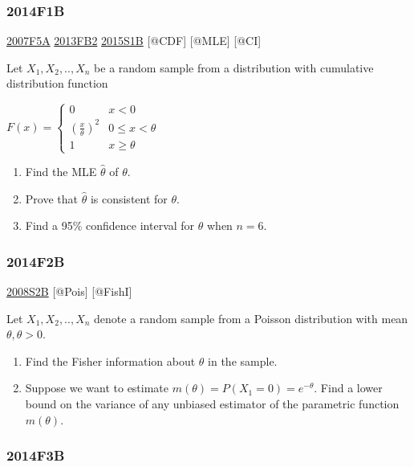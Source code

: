 \documentclass[6pt,Portrait]{article}
\begin{document}
\hypertarget{f1b-1}{%
\subsubsection{2014F1B}\label{f1b-1}}

\protect\hyperlink{f5a}{2007F5A} \protect\hyperlink{fb2-2}{2013FB2}
\protect\hyperlink{s1b-1}{2015S1B} {[}@CDF{]} {[}@MLE{]} {[}@CI{]}

Let \(X_1,X_2,..,X_n\) be a random sample from a distribution with
cumulative distribution function

\(F(x)=\begin{cases}0&x<0\\(\frac{x}\theta)^2& 0\le x<\theta\\1& x\ge\theta\end{cases}\)

\begin{enumerate}
\def\labelenumi{(\alph{enumi})}
\item
  Find the MLE \(\hat\theta\) of \(\theta\).
\item
  Prove that \(\hat\theta\) is consistent for \(\theta\).
\item
  Find a 95\% confidence interval for \(\theta\) when \(n=6\).
\end{enumerate}

\hypertarget{f2b-1}{%
\subsubsection{2014F2B}\label{f2b-1}}

\protect\hyperlink{s2b}{2008S2B} {[}@Pois{]} {[}@FishI{]}

Let \(X_1,X_2,..,X_{n}\) denote a random sample from a Poisson
distribution with mean \(\theta,\theta>0\).

\begin{enumerate}
\def\labelenumi{(\alph{enumi})}
\item
  Find the Fisher information about \(\theta\) in the sample.
\item
  Suppose we want to estimate \(m(\theta)=P(X_1=0)=e^{-\theta}\). Find a
  lower bound on the variance of any unbiased estimator of the
  parametric function \(m(\theta)\).
\end{enumerate}

\hypertarget{f3b-1}{%
\subsubsection{2014F3B}\label{f3b-1}}
\end{document}
